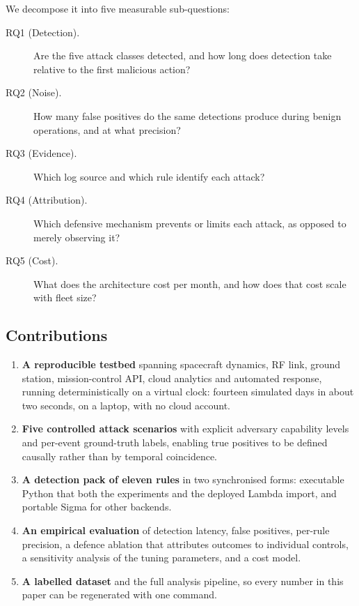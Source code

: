 We decompose it into five measurable sub-questions:

\begin{description}
\item[RQ1 (Detection).] Are the five attack classes detected, and how long does
detection take relative to the first malicious action?
\item[RQ2 (Noise).] How many false positives do the same detections produce
during benign operations, and at what precision?
\item[RQ3 (Evidence).] Which log source and which rule identify each attack?
\item[RQ4 (Attribution).] Which defensive mechanism prevents or limits each
attack, as opposed to merely observing it?
\item[RQ5 (Cost).] What does the architecture cost per month, and how does that
cost scale with fleet size?
\end{description}

\subsection*{Contributions}

\begin{enumerate}
\item \textbf{A reproducible testbed} spanning spacecraft dynamics, RF link,
ground station, mission-control API, cloud analytics and automated response,
running deterministically on a virtual clock: fourteen simulated days in about
two seconds, on a laptop, with no cloud account.
\item \textbf{Five controlled attack scenarios} with explicit adversary
capability levels and per-event ground-truth labels, enabling true positives to
be defined causally rather than by temporal coincidence.
\item \textbf{A detection pack of eleven rules} in two synchronised forms:
executable Python that both the experiments and the deployed Lambda import, and
portable Sigma \cite{sigma} for other backends.
\item \textbf{An empirical evaluation} of detection latency, false positives,
per-rule precision, a defence ablation that attributes outcomes to individual
controls, a sensitivity analysis of the tuning parameters, and a cost model.
\item \textbf{A labelled dataset} and the full analysis pipeline, so every number
in this paper can be regenerated with one command.
\end{enumerate}
